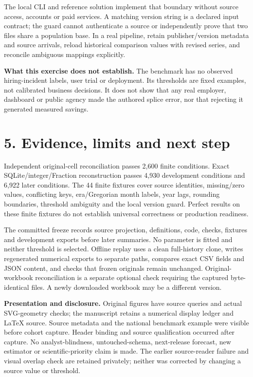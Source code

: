 \documentclass[10pt,letterpaper]{article}
\begin{document}
The local CLI and reference solution implement that boundary without source access, accounts or paid services. A matching version string is a declared input contract; the guard cannot authenticate a source or independently prove that two files share a population base. In a real pipeline, retain publisher/version metadata and source arrivals, reload historical comparison values with revised series, and reconcile ambiguous mappings explicitly.

\textbf{What this exercise does not establish.} The benchmark has no observed hiring-incident labels, user trial or deployment. Its thresholds are fixed examples, not calibrated business decisions. It does not show that any real employer, dashboard or public agency made the authored splice error, nor that rejecting it generated measured savings.
\newpage
\section*{5. Evidence, limits and next step}
Independent original-cell reconciliation passes 2,600 finite conditions. Exact SQLite/integer/Fraction reconstruction passes 4,930 development conditions and 6,922 later conditions. The 44 finite fixtures cover source identities, missing/zero values, conflicting keys, era/Gregorian month labels, year lags, rounding boundaries, threshold ambiguity and the local version guard. Perfect results on these finite fixtures do not establish universal correctness or production readiness.

The committed freeze records source projection, definitions, code, checks, fixtures and development exports before later summaries. No parameter is fitted and neither threshold is selected. Offline replay uses a clean full-history clone, writes regenerated numerical exports to separate paths, compares exact CSV fields and JSON content, and checks that frozen originals remain unchanged. Original-workbook reconciliation is a separate optional check requiring the captured byte-identical files. A newly downloaded workbook may be a different version.

\textbf{Presentation and disclosure.} Original figures have source queries and actual SVG-geometry checks; the manuscript retains a numerical display ledger and LaTeX source. Source metadata and the national benchmark example were visible before cohort capture. Header binding and source qualification occurred after capture. No analyst-blindness, untouched-schema, next-release forecast, new estimator or scientific-priority claim is made. The earlier source-reader failure and visual overlap check are retained privately; neither was corrected by changing a source value or threshold.
\end{document}

